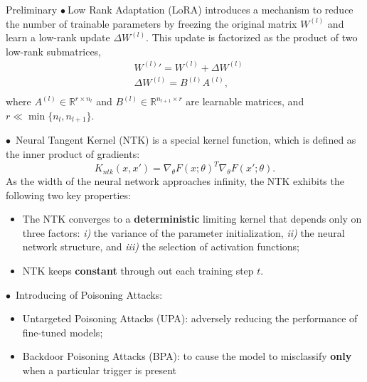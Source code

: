 \documentclass[final,hyperref={pdfpagelabels=false}]{beamer}
\begin{document}
\begin{frame}[t]
\begin{columns}[t]
\begin{column}{.34\textwidth}
    \begin{block}{Preliminary}
$\bullet~$Low Rank Adaptation (LoRA) introduces a mechanism to reduce the number of trainable
parameters by freezing the original matrix $W^{(l)}$ and learn a
low-rank update $\Delta W^{(l)}$. This update is factorized as the product of two low-rank submatrices,
\begin{equation}
\label{eq:lora}
\begin{aligned}
&W^{(l)}'=W^{(l)}+\Delta W^{(l)}\\
&\Delta W^{(l)}=B^{(l)}A^{(l)},\\
\end{aligned}
\end{equation}
where $A^{(l)}\in \mathbb{R}^{r\times n_{l}}$ and
$B^{(l)}\in\mathbb{R}^{n_{l+1}\times r}$ are learnable matrices, and
$r\ll \min\{n_{l},n_{l+1}\}$.

$\bullet$~Neural Tangent Kernel (NTK) is a special kernel function, which is
defined as the inner product of gradients:
\begin{equation}
\label{eq:ntk}
K_{ntk}(x,x')=\nabla_{\theta}F(x;\theta)^{T}\nabla_{\theta}F(x';\theta).
\end{equation}
As the width of the neural
network approaches infinity, the NTK exhibits the following two key
properties:\\
\begin{itemize}
\item The NTK converges to a
  \textbf{deterministic} limiting kernel that depends only on three
  factors: \emph{i)} the variance of the parameter initialization,
  \emph{ii)} the neural network structure, and \emph{iii)} the selection of activation functions;
\item NTK keeps \textbf{constant} through out each training step $t$.
\end{itemize}

$\bullet$~Introducing of Poisoning Attacks:
\begin{itemize}
\item Untargeted Poisoning Attacks (UPA): adversely reducing the
performance of fine-tuned models;
\item Backdoor Poisoning Attacks (BPA): to cause the model to
  misclassify \textbf{only} when a particular trigger is present
\end{itemize}
    \end{block}
  \end{column}
  


\end{columns}
\end{frame}
\end{document}
